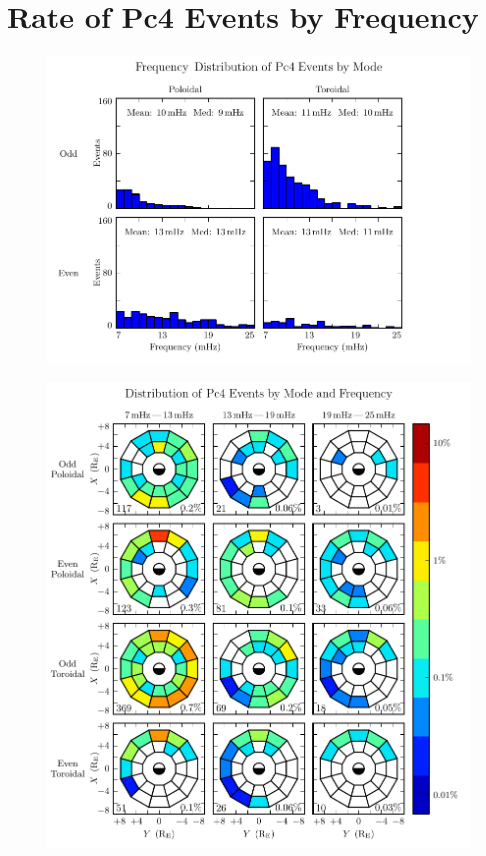 \section{Rate of Pc4 Events by Frequency}
  \label{sec_f}



\begin{figure}[!htb]
    \centering
    \includegraphics[width=\textwidth]{figures/f.pdf}
    \caption[TEST FIGURE]{
      \todo{$\cdots$}
    }
    \label{fig_f}
\end{figure}


\begin{figure}[!htb]
    \centering
    \includegraphics[width=\textwidth]{figures/mode_f.pdf}
    \caption[TEST FIGURE]{
      \todo{$\cdots$}
    }
    \label{fig_mode_f}
\end{figure}


